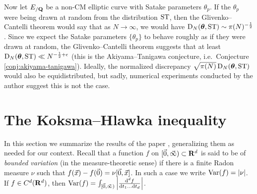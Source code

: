 Now let $E_{/\mathbf{Q}}$ be a non-CM elliptic curve with Satake parameters 
$\theta_p$. If the $\theta_p$ were being drawn at random from the distribution 
$\mathrm{ST}$, then the Glivenko--Cantelli theorem would say that as $N\to \infty$, 
we would have $\operatorname{D}_N({\boldsymbol\theta},\mathrm{ST}) \sim \pi(N)^{-\frac 1 2}$. Since we 
expect the Satake parameters $\{\theta_p\}$ to behave roughly as if they were 
drawn at random, the Glivenko--Cantelli theorem suggests that at least 
$\operatorname{D}_N({\boldsymbol\theta},\mathrm{ST}) \ll N^{-\frac 1 2+\epsilon}$ (this is the 
Akiyama--Tanigawa conjecture, i.e.~Conjecture \ref{conj:akiyama-tanigawa}). 
Ideally, the normalized discrepancy $\sqrt{\pi(N)}\operatorname{D}_N({\boldsymbol\theta},\mathrm{ST})$ would also 
be equidistributed, but sadly, numerical experiments conducted by the author 
suggest this is not the case. 





\section{The Koksma--Hlawka inequality}

In this section we summarize the results of the paper \cite{okten-1999}, 
generalizing them as needed for our context. Recall that a function $f$ on 
$[\vec{0},\vec{\infty})\subset \mathbf{R}^d$ is said to be of \emph{bounded variation} (in 
the measure-theoretic sense) if there is a finite Radon measure $\nu$ such that 
$f(\vec{x}) - f(\vec{0}) = \nu[\vec{0},\vec{x}]$. In such a case we write 
$\operatorname{Var}(f) = |\nu|$. If $f\in C^d(\mathbf{R}^d)$, then 
$\operatorname{Var}(f) = \int_{[\vec{0},\vec{\infty})} \left|\frac{\mathrm{d}^d f}{\mathrm{d} t_1 \dots \mathrm{d} t_d} \right|$. 

